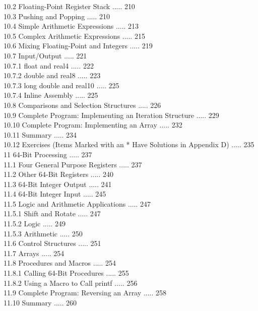 \documentclass[10pt]{book}
\begin{document}
10.2 Floating-Point Register Stack ..... 210\\
10.3 Pushing and Popping ..... 210\\
10.4 Simple Arithmetic Expressions ..... 213\\
10.5 Complex Arithmetic Expressions ..... 215\\
10.6 Mixing Floating-Point and Integers ..... 219\\
10.7 Input/Output ..... 221\\
10.7.1 float and real4 ..... 222\\
10.7.2 double and real8 ..... 223\\
10.7.3 long double and real10 ..... 225\\

10.7.4 Inline Assembly ..... 225\\
10.8 Comparisons and Selection Structures ..... 226\\
10.9 Complete Program: Implementing an Iteration Structure ..... 229\\
10.10 Complete Program: Implementing an Array ..... 232\\
10.11 Summary ..... 234\\
10.12 Exercises (Items Marked with an * Have Solutions in Appendix D) ..... 235\\
11 64-Bit Processing ..... 237\\
11.1 Four General Purpose Registers ..... 237\\
11.2 Other 64-Bit Registers ..... 240\\
11.3 64-Bit Integer Output ..... 241\\
11.4 64-Bit Integer Input ..... 245\\
11.5 Logic and Arithmetic Applications ..... 247\\
11.5.1 Shift and Rotate ..... 247\\
11.5.2 Logic ..... 249\\
11.5.3 Arithmetic ..... 250\\
11.6 Control Structures ..... 251\\
11.7 Arrays ..... 254\\
11.8 Procedures and Macros ..... 254\\
11.8.1 Calling 64-Bit Procedures ..... 255\\
11.8.2 Using a Macro to Call printf ..... 256\\
11.9 Complete Program: Reversing an Array ..... 258\\
11.10 Summary ..... 260\\
\end{document}
